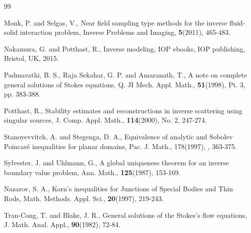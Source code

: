 \begin{thebibliography}{99}
                    
              
              
              

  Monk, P. and Selgas, V., Near field sampling type methods for the inverse fluid-solid interaction
              problem, Inverse Problems and Imaging, {\bf 5}(2011), 465-483.




  Nakamura, G. and Potthast, R.,
          \newblock Inverse modeling,
          \newblock IOP ebooks, IOP publishing, Bristol, UK, 2015.



  Padmavathi, B. S., Raja Sekahar, G. P. and Amaranath, T.,
            A note on complete general solutions of Stokes equations,
            Q. JI Mech. Appl. Math., {\bf 51}(1998), Pt. 3, pp. 383-388.








 Potthast, R.,
             \newblock Stability estimates and reconstructions in inverse scattering using singular sources,
             \newblock J. Comp. Appl. Math., {\bf 114}(2000), No. 2, 247-274.








  Stanoyevvitch, A. and Stegenga, D. A.,
             Equivalence of analytic and Sobolev Poincar\'e inequalities for planar domains, 
             Pac. J. Math., 178(1997), , 363-375.






         
              
 Sylvester, J. and Uhlmann, G.,
              A global uniqueness theorem for an inverse boundary value problem,
              Ann. Math., {\bf 125}(1987), 153-169.






  Nazarov, S. A., 
                 Korn's inequalities for Junctions of Special Bodies and Thin Rods, 
                 Math. Methods. Appl. Sci., {\bf 20}(1997), 219-243.




              
  Tran-Cong, T. and Blake, J. R.,
               General solutions of the Stokes's flow equations,
               J. Math. Anal. Appl., {\bf 90}(1982), 72-84.









\end{thebibliography}

